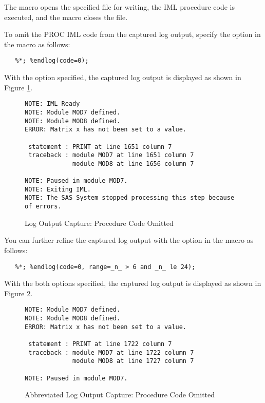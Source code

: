 \documentclass[article,oneside]{memoir}
\begin{document}
  The  macro opens the specified file for writing, the IML
  procedure code is executed, and the  macro closes the file.
  
  To omit the PROC IML code from the captured log output,   
  specify the  option in the  macro as follows:

\begin{snugshade}
\begin{verbatim}  
   %*; %endlog(code=0);
\end{verbatim}
\end{snugshade}

   With the  option specified, the captured log output is 
   displayed as shown in Figure \ref{lognoproc}.
   
\begin{figure}[H]
\begin{snugshade}
\begin{verbatim}
NOTE: IML Ready
NOTE: Module MOD7 defined.
NOTE: Module MOD8 defined.
ERROR: Matrix x has not been set to a value.

 statement : PRINT at line 1651 column 7
 traceback : module MOD7 at line 1651 column 7
             module MOD8 at line 1656 column 7

NOTE: Paused in module MOD7.
NOTE: Exiting IML.
NOTE: The SAS System stopped processing this step because of errors.
\end{verbatim}
\end{snugshade}
\caption{Log Output Capture: Procedure Code Omitted}\label{lognoproc}
\end{figure}

  You can further refine the captured log output with the 
   option in the  macro as follows:
   
\begin{snugshade}
\begin{verbatim}
   %*; %endlog(code=0, range=_n_ > 6 and _n_ le 24);
\end{verbatim}
\end{snugshade}
  With the both options specified, the captured log output is displayed as
   shown in Figure \ref{logabbrev}.

\begin{figure}[H]
\begin{snugshade}
\begin{verbatim}
NOTE: Module MOD7 defined.
NOTE: Module MOD8 defined.
ERROR: Matrix x has not been set to a value.

 statement : PRINT at line 1722 column 7
 traceback : module MOD7 at line 1722 column 7
             module MOD8 at line 1727 column 7

NOTE: Paused in module MOD7.
\end{verbatim}
\end{snugshade}
\caption{Abbreviated Log Output Capture: Procedure Code Omitted}\label{logabbrev}
\end{figure}
  
\end{document}
